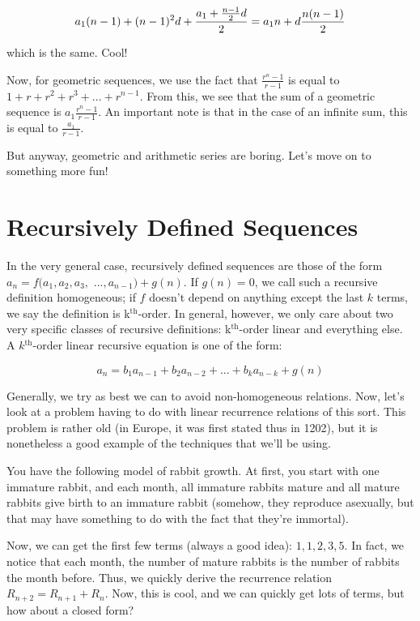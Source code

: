 \documentclass[12pt,letterpaper]{article}
\renewcommand{\th}{\ensuremath{^{\text{th}}}}
\begin{document}
$$a_1 (n - 1) + (n - 1)^2 d + \frac{a_1 + \frac{n - 1}{2} d}{2} \\
= a_1 n + d \frac{n (n-1)}{2}$$

which is the same. Cool!

Now, for geometric sequences, we use the fact that $\frac{r^n - 1}{r
  - 1}$ is equal to $1 + r + r^2 + r^3 + ... + r^{n-1}$. From this, we
see that the sum of a geometric sequence is $a_1 \frac{r^n - 1}{r -
  1}$. An important note is that in the case of an infinite sum, this
is equal to $\frac{a_1}{r - 1}$.

But anyway, geometric and arithmetic series are boring. Let's move on to
something more fun!

\section{Recursively Defined Sequences}
In the very general case, recursively defined sequences are those of
the form $a_n = f(a_1, a_2, a_3,$ $..., a_{n-1}) + g(n)$. If $g(n) = 0$,
we call such a recursive definition homogeneous; if $f$ doesn't depend
on anything except the last $k$ terms, we say the definition is
k\th-order. In general, however, we only care about two very
specific classes of recursive definitions: k\th-order linear and
everything else. A $k$\th-order linear recursive equation is one of
the form:

$$a_n = b_1 a_{n-1} + b_2 a_{n-2} + ... + b_k a_{n - k} + g(n)$$

Generally, we try as best we can to avoid non-homogeneous
relations. Now, let's look at a problem having to do with linear
recurrence relations of this sort. This problem is rather old (in
Europe, it was first stated thus in 1202), but it is nonetheless a
good example of the techniques that we'll be using.

You have the following model of rabbit growth. At first, you start
with one immature rabbit, and each month, all immature rabbits mature
and all mature rabbits give birth to an immature rabbit (somehow, they
reproduce asexually, but that may have something to do with the fact
that they're immortal).

Now, we can get the first few terms (always a good idea): $1, 1, 2, 3,
5$.  In fact, we notice that each month, the number of mature rabbits
is the number of rabbits the month before. Thus, we quickly derive the
recurrence relation $R_{n+2} = R_{n+1} + R_n$. Now, this is cool, and
we can quickly get lots of terms, but how about a closed form?
\end{document}
